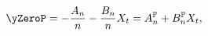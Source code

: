 \begin{equation*}
	\yZeroP = - \frac{\affineA}{\tnr} - \frac{\affineB}{\tnr} \Xvars = \affineA^{\Pmeasure} + \affineB^{\Pmeasure} \Xvars,
\end{equation*}